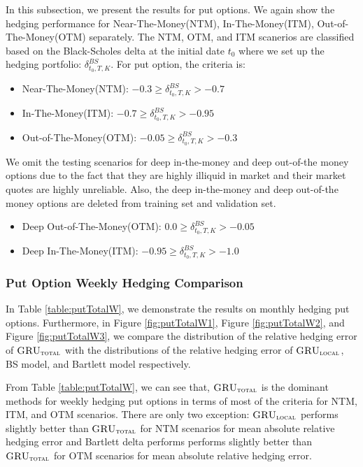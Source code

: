 \documentclass[letterpaper,12pt,titlepage,oneside,final]{book}
\numberwithin{equation}{section}
\theoremstyle{definition}
\newcommand{\modelT}{\textsc{GRU}_{\textsc{total}}}
\newcommand{\modelL}{\textsc{GRU}_{\textsc{local}}}
\begin{document}
In this subsection, we present the results for put options. We again show the hedging performance for Near-The-Money(NTM), In-The-Money(ITM), Out-of-The-Money(OTM) separately.  The NTM, OTM, and ITM scanerios are classified based on the Black-Scholes delta at the initial date $t_0$ where we set up the hedging portfolio: $\delta^{BS}_{t_0,T,K}$. For put option, the criteria is:
\begin{itemize}
	\item  Near-The-Money(NTM): $-0.3 \geq \delta^{BS}_{t_0,T,K} >-0.7$
	\item  In-The-Money(ITM): $-0.7 \geq \delta^{BS}_{t_0,T,K} >-0.95$
	\item  Out-of-The-Money(OTM): $-0.05 \geq \delta^{BS}_{t_0,T,K} >-0.3$
\end{itemize}
We omit the testing scenarios for deep in-the-money and deep out-of-the money options due to the fact that they are highly illiquid in market and their market quotes are highly unreliable. Also, the deep in-the-money and deep out-of-the money options are deleted from training set and validation set.
\begin{itemize}
	\item  Deep Out-of-The-Money(OTM): $0.0 \geq \delta^{BS}_{t_0,T,K} >-0.05$
	\item  Deep In-The-Money(ITM): $-0.95 \geq \delta^{BS}_{t_0,T,K} >-1.0$
\end{itemize}
\subsubsection{Put Option Weekly Hedging Comparison}
In Table \ref{table:putTotalW}, we demonstrate the results on monthly hedging put options. Furthermore, in Figure \ref{fig:putTotalW1}, Figure \ref{fig:putTotalW2}, and  Figure \ref{fig:putTotalW3}, we compare the distribution of the relative hedging error of $\modelT$ with the distributions of the relative hedging error of $\modelL$, BS model, and Bartlett model respectively.

From Table \ref{table:putTotalW}, we can see that, $\modelT$ is the dominant  methods for weekly hedging put options in terms of most of the criteria for NTM, ITM, and OTM scenarios.  There are only two  exception: $\modelL$ performs slightly better than $\modelT$ for NTM scenarios for mean absolute relative hedging error  and Bartlett delta performs performs slightly better than $\modelT$ for OTM scenarios for mean absolute relative hedging error. 
\end{document}
